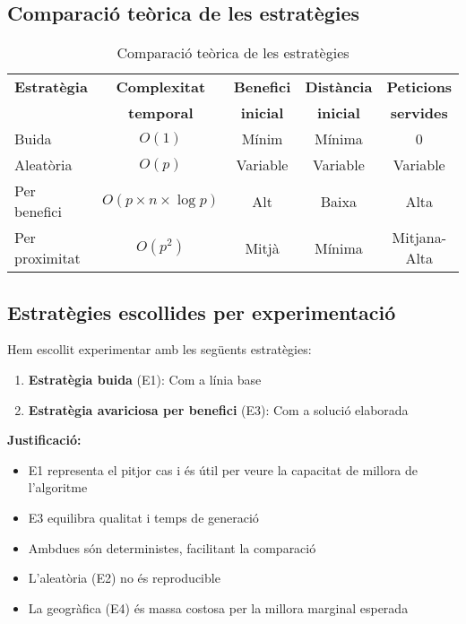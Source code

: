 \subsection{Comparació teòrica de les estratègies}

\begin{table}[H]
\centering
\begin{tabular}{@{}lcccc@{}}
\toprule
\textbf{Estratègia} & \textbf{Complexitat} & \textbf{Benefici} & \textbf{Distància} & \textbf{Peticions} \\
 & \textbf{temporal} & \textbf{inicial} & \textbf{inicial} & \textbf{servides} \\
\midrule
Buida & $O(1)$ & Mínim & Mínima & 0 \\
Aleatòria & $O(p)$ & Variable & Variable & Variable \\
Per benefici & $O(p \times n \times \log p)$ & Alt & Baixa & Alta \\
Per proximitat & $O(p^2)$ & Mitjà & Mínima & Mitjana-Alta \\
\bottomrule
\end{tabular}
\caption{Comparació teòrica de les estratègies}
\label{tab:estrategies-comp}
\end{table}

\subsection{Estratègies escollides per experimentació}

Hem escollit experimentar amb les següents estratègies:

\begin{enumerate}
    \item \textbf{Estratègia buida} (E1): Com a línia base
    \item \textbf{Estratègia avariciosa per benefici} (E3): Com a solució elaborada
\end{enumerate}

\textbf{Justificació:}
\begin{itemize}
    \item E1 representa el pitjor cas i és útil per veure la capacitat de millora de l'algoritme
    \item E3 equilibra qualitat i temps de generació
    \item Ambdues són deterministes, facilitant la comparació
    \item L'aleatòria (E2) no és reproducible
    \item La geogràfica (E4) és massa costosa per la millora marginal esperada
\end{itemize}

